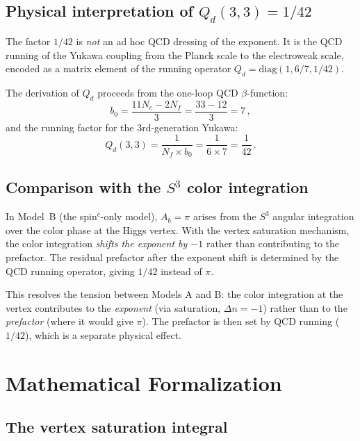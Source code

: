 \documentclass[11pt,a4paper]{article}
\theoremstyle{definition}
\theoremstyle{remark}
\begin{document}
\subsection{Physical interpretation of $Q_d(3,3) = 1/42$}

The factor $1/42$ is \emph{not} an ad hoc QCD dressing of the exponent.
It is the QCD running of the Yukawa coupling from the Planck scale to
the electroweak scale, encoded as a matrix element of the running operator
$Q_d = \text{diag}(1, 6/7, 1/42)$.

The derivation of $Q_d$ proceeds from the one-loop QCD $\beta$-function:
\begin{equation}
b_0 = \frac{11N_c - 2N_f}{3} = \frac{33 - 12}{3} = 7\,,
\end{equation}
and the running factor for the 3rd-generation Yukawa:
\begin{equation}
Q_d(3,3) = \frac{1}{N_f \times b_0} = \frac{1}{6 \times 7} = \frac{1}{42}\,.
\end{equation}

\subsection{Comparison with the $S^3$ color integration}

In Model~B (the spin$^c$-only model), $A_b = \pi$ arises from the $S^3$
angular integration over the color phase at the Higgs vertex.  With the
vertex saturation mechanism, the color integration \emph{shifts the exponent
by $-1$} rather than contributing to the prefactor.  The residual prefactor
after the exponent shift is determined by the QCD running operator, giving
$1/42$ instead of $\pi$.

This resolves the tension between Models A and B: the color integration
at the vertex contributes to the \emph{exponent} (via saturation, $\Delta n = -1$)
rather than to the \emph{prefactor} (where it would give $\pi$).
The prefactor is then set by QCD running ($1/42$), which is a separate
physical effect.

\section{Mathematical Formalization}
\label{sec:formal}

\subsection{The vertex saturation integral}
\end{document}
